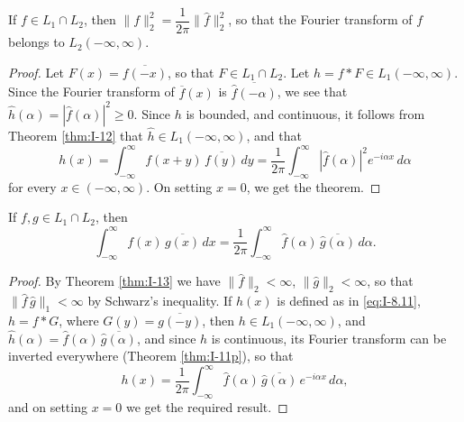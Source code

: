 \begin{theorem}\label{thm:I-13}
If $f\in L_1\cap L_2$, then $\|f\|_2^{2}=\dfrac{1}{2\pi}\|\widehat f\|_2^{2}$, so that the Fourier transform of $f$ belongs to $L_2(-\infty,\infty)$.
\end{theorem}

\begin{proof}
Let $F(x)=\overline{f(-x)}$, so that $F\in L_1\cap L_2$. Let $h=f*F\in L_1(-\infty,\infty)$. Since the Fourier transform of $\overline f(x)$ is $\overline{\widehat f(-\alpha)}$, we see that $\hat h(\alpha)=|\widehat f(\alpha)|^{2}\ge 0$. Since $h$ is bounded, and continuous, it follows from Theorem \ref{thm:I-12} that $\hat h\in L_1(-\infty,\infty)$, and that
\begin{equation*}
h(x)=\int_{-\infty}^{\infty}f(x+y)\,\overline{f(y)}\,dy
=\frac{1}{2\pi}\int_{-\infty}^{\infty}|\widehat f(\alpha)|^{2}e^{-i\alpha x}\,d\alpha
\end{equation*}
for every $x\in(-\infty,\infty)$. On setting $x=0$, we get the theorem.
\end{proof}

\begin{theorem}\label{thm:I-14}
If $f,g\in L_1\cap L_2$, then
\begin{equation*}
\int_{-\infty}^{\infty}f(x)\,\overline{g(x)}\,dx
=\frac{1}{2\pi}\int_{-\infty}^{\infty}\widehat f(\alpha)\,\overline{\widehat g(\alpha)}\,d\alpha.
\end{equation*}
\end{theorem}

\begin{proof}
By Theorem \ref{thm:I-13} we have $\|\widehat f\|_2<\infty$, $\|\widehat g\|_2<\infty$, so that $\|\widehat f\,\widehat g\|_1<\infty$ by Schwarz's inequality. If $h(x)$ is defined as in \eqref{eq:I-8.11}, $h=f*G$, where $G(y)=\overline{g(-y)}$, then $h\in L_1(-\infty,\infty)$, and $\hat h(\alpha)=\widehat f(\alpha)\,\overline{\widehat g(\alpha)}$, and since $h$ is continuous, its Fourier transform can be inverted everywhere (Theorem \ref{thm:I-11p}), so that
\begin{equation*}
h(x)=\frac{1}{2\pi}\int_{-\infty}^{\infty}\widehat f(\alpha)\,\overline{\widehat g(\alpha)}\,e^{-i\alpha x}\,d\alpha,
\end{equation*}
and on setting $x=0$ we get the required result.
\end{proof}

